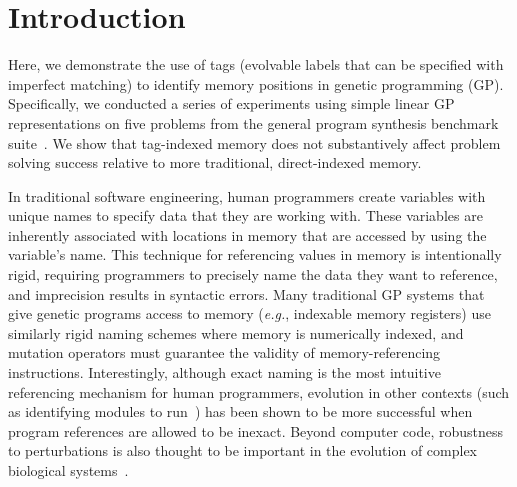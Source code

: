\section{Introduction}

Here, we demonstrate the use of tags (evolvable labels that can be specified with imperfect matching) to identify memory positions in genetic programming (GP).
Specifically, we conducted a series of experiments using simple linear GP representations on five problems from the general program synthesis benchmark suite~\citep{helmuth_general_2015}.  
We show that tag-indexed memory does not substantively affect problem solving success relative to more traditional, direct-indexed memory.

In traditional software engineering, human programmers create variables with unique names to specify data that they are working with.  
These variables are inherently associated with locations in memory that are accessed by using the variable's name.
This technique for referencing values in memory is intentionally rigid, requiring programmers to precisely name the data they want to reference, and imprecision results in syntactic errors.
Many traditional GP systems that give genetic programs access to memory (\textit{e.g.}, indexable memory registers) use similarly rigid naming schemes where memory is numerically indexed, and mutation operators must guarantee the validity of memory-referencing instructions. 
Interestingly, although exact naming is the most intuitive referencing mechanism
for human programmers, evolution in other contexts (such as identifying modules to run~\citep{lalejini_what_2019}) has been shown to be more successful when program references are allowed to be inexact.
Beyond computer code, robustness to perturbations is also thought to be important in the evolution of complex biological systems~\citep{kitano_biological_2004}.



